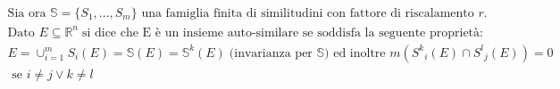 \documentclass[preview]{standalone}
\begin{document}
\begin{align*}
\text{Sia ora }  \mathbb{S} = \{S_1, \dots, S_m\} \text{ una famiglia finita di similitudini con fattore di riscalamento } r.\\ \text{Dato } E \subseteq \mathbb{R}^n \;\text{si dice che E è un insieme auto-similare se soddisfa la seguente proprietà:} \\  E = \cup_{i=1}^m S_i(E) =  \mathbb{S}(E) = \mathbb{S}^k(E) \; \text{(invarianza per } \mathbb{S}\text{)} \text{ ed inoltre } m({S^k}_i(E) \cap {S^l}_j(E)) = 0 \\ \text{ se } i\not = j \lor k \not = l \\
\end{align*}
\end{document}
